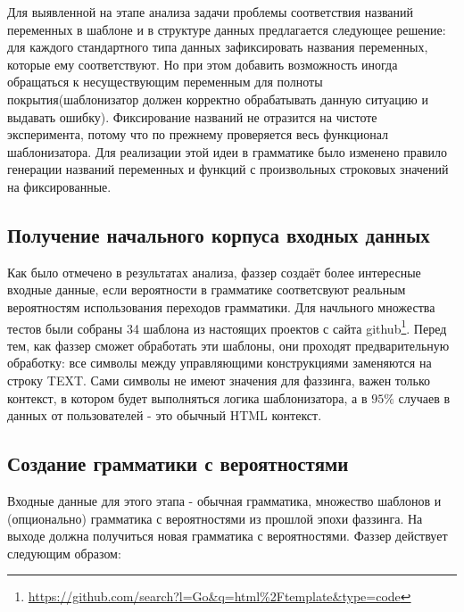 \documentclass[a4paper]{article}
\begin{document}
Для выявленной на этапе анализа задачи проблемы соответствия названий переменных в шаблоне и в структуре данных предлагается следующее решение: для каждого стандартного типа данных зафиксировать названия переменных, которые ему соответствуют. Но при этом добавить возможность иногда обращаться к несуществующим переменным для полноты покрытия(шаблонизатор должен корректно обрабатывать данную ситуацию и выдавать ошибку). Фиксирование названий не отразится на чистоте эксперимента, потому что по прежнему проверяется весь функционал шаблонизатора. Для реализации этой идеи в грамматике было изменено правило генерации названий переменных и  функций с произвольных строковых значений на фиксированные.

\subsection{Получение начального корпуса входных данных}

Как было отмечено в результатах анализа, фаззер создаёт более интересные входные данные, если вероятности в грамматике соответсвуют реальным вероятностям использования переходов грамматики. Для начльного множества тестов были собраны 34 шаблона из настоящих проектов с сайта github\footnote{\href{https://github.com/search?l=Go\&q=html\%2Ftemplate\&type=code}{https://github.com/search?l=Go\&q=html\%2Ftemplate\&type=code}}. Перед тем, как фаззер сможет обработать эти шаблоны, они проходят предварительную обработку: все символы между управляющими конструкциями заменяются на строку TEXT. Сами символы не имеют значения для фаззинга, важен только контекст, в котором будет выполняться логика шаблонизатора, а в $95\%$ случаев в данных от пользователей - это обычный HTML контекст.

\subsection{Создание грамматики с вероятностями}
Входные данные для этого этапа - обычная грамматика, множество шаблонов и (опционально) грамматика с вероятностями из прошлой эпохи фаззинга. На выходе должна получиться новая грамматика с вероятностями. Фаззер действует следующим образом:
\end{document}
